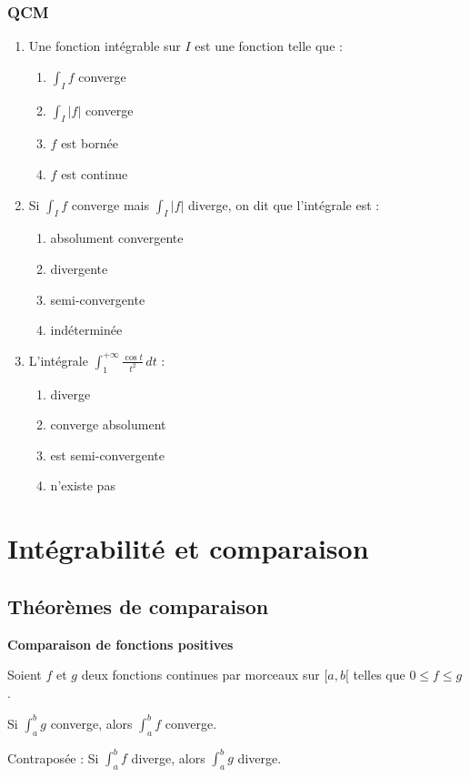 \documentclass[../PolyS4.tex]{subfiles}
\begin{document}
\subsubsection*{QCM}

\begin{enumerate}
\item Une fonction intégrable sur $I$ est une fonction telle que :
\begin{enumerate}
\item $\displaystyle\int_{I} f$ converge
\item $\displaystyle\int_{I} |f|$ converge
\item $f$ est bornée
\item $f$ est continue
\end{enumerate}

\item Si $\displaystyle\int_{I} f$ converge mais $\displaystyle\int_{I} |f|$ diverge, on dit que l'intégrale est :
\begin{enumerate}
\item absolument convergente
\item divergente
\item semi-convergente
\item indéterminée
\end{enumerate}

\item L'intégrale $\displaystyle\int_{1}^{+\infty} \frac{\cos t}{t^2} \, dt$ :
\begin{enumerate}
\item diverge
\item converge absolument
\item est semi-convergente
\item n'existe pas
\end{enumerate}
\end{enumerate}

\section{Intégrabilité et comparaison}

\subsection{Théorèmes de comparaison}

\begin{Thm}
\textbf{Comparaison de fonctions positives}

Soient $f$ et $g$ deux fonctions continues par morceaux sur $[a, b[$ telles que $0 \leq f \leq g$.

Si $\displaystyle\int_{a}^{b} g$ converge, alors $\displaystyle\int_{a}^{b} f$ converge.

Contraposée : Si $\displaystyle\int_{a}^{b} f$ diverge, alors $\displaystyle\int_{a}^{b} g$ diverge.
\end{Thm}
\end{document}
